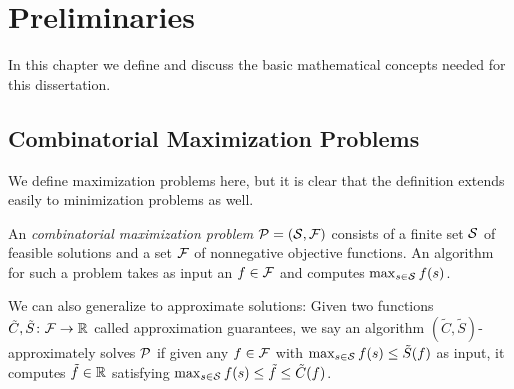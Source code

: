\chapter{Preliminaries}
In this chapter we define and discuss the basic mathematical concepts needed for this dissertation.
\section{Combinatorial Maximization Problems}
We define maximization problems here, but it is clear that the definition extends easily to minimization problems as well.
\begin{definition}
An \emph{combinatorial maximization problem} \(\mathcal P = (\mathcal S, \mathcal F)\)
consists of a finite set
\(\mathcal S\) of feasible solutions and a set \(\mathcal F\) of nonnegative
objective functions. An algorithm for such a problem takes as input an $f \in \mathcal F$ and computes
$\max_{s \in \mathcal S} f(s)$.

We can also generalize to approximate solutions: Given two functions \(\tilde{C}, \tilde{S} \colon \mathcal F \rightarrow \mathbb R\)
called approximation guarantees, we say
an algorithm \((\tilde{C}, \tilde{S})\)-approximately solves \(\mathcal P\)
if given any \(f \in \mathcal F\) with \(\max_{s \in \mathcal S} f(s) \leq \tilde{S}(f)\) as input,
it computes \(\tilde{f}\in \mathbb R\) satisfying
\(\max_{s \in \mathcal S} f(s) \leq \tilde{f} \leq \tilde{C}(f)\).
\end{definition}

